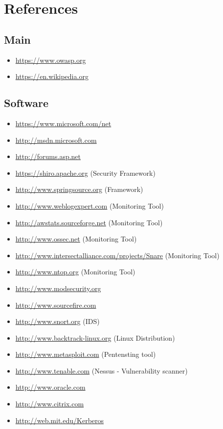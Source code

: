 \section*{References}

\subsection*{Main}
\begin{itemize}
\item \url{https://www.owasp.org}
\item \url{https://en.wikipedia.org}

\end{itemize}

\subsection*{Software}
\begin{itemize}
\item \url{https://www.microsoft.com/net}
\item \url{http://msdn.microsoft.com}
\item \url{http://forums.asp.net}

\item \url{https://shiro.apache.org} (Security Framework)
\item \url{http://www.springsource.org} (Framework)

\item \url{http://www.weblogexpert.com} (Monitoring Tool)
\item \url{http://awstats.sourceforge.net} (Monitoring Tool)
\item \url{http://www.ossec.net} (Monitoring Tool)
\item \url{http://www.intersectalliance.com/projects/Snare} (Monitoring Tool)
\item \url{http://www.ntop.org} (Monitoring Tool)

\item \url{http://www.modsecurity.org}
\item \url{http://www.sourcefire.com}
\item \url{http://www.snort.org} (IDS)
\item \url{http://www.backtrack-linux.org} (Linux Distribution)
\item \url{http://www.metasploit.com} (Pentensting tool)
\item \url{http://www.tenable.com} (Nessus - Vulnerability scanner)
\item \url{http://www.oracle.com}
\item \url{http://www.citrix.com}

\item \url{http://web.mit.edu/Kerberos}


\end{itemize}
